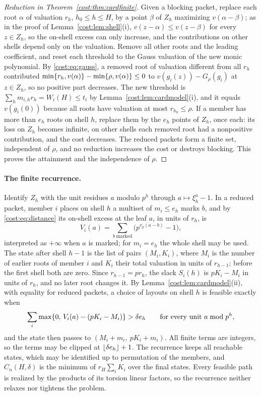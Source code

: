 \begin{proof}[Reduction in Theorem~\ref{cost:thm:cardfinite}]
Given a blocking packet, replace each root $\alpha$ of valuation $r_h$, $h_0\le h\le H$, by a
point $\beta$ of $Z_h$ maximizing $v(\alpha-\beta)$; as in the proof of
Lemma~\ref{cost:lem:shell}(i), $v(z-\alpha)\le v(z-\beta)$ for every $z\in Z_h$, so the
on-shell excess can only increase, and the contributions on other shells depend only on the
valuation. Remove all other roots and the leading coefficient, and reset each threshold to
the Gauss valuation of the new monic polynomial. By \eqref{cost:eq:gauss}, a removed root of
valuation different from all $r_h$ contributed $\min\{r_h,v(\alpha)\}-\min\{\rho,v(\alpha)\}\le0$
to $v(g_i(z))-G_\rho(g_i)$ at $z\in Z_h$, so no positive part decreases. The new threshold
is $\sum_hm_{i,h}r_h=W_i(H)\le t_i$ by Lemma~\ref{cost:lem:cardmodel}(i), and it equals
$v(g_i(0))$ because all roots have valuation at most $r_{h_0}\le\rho$. If a member has more
than $e_h$ roots on shell $h$, replace them by the $e_h$ points of $Z_h$, once each: its loss
on $Z_h$ becomes infinite, on other shells each removed root had a nonpositive contribution,
and the cost decreases. The reduced packets form a finite set, independent of $\rho$, and no
reduction increases the cost or destroys blocking. This proves the attainment and the
independence of $\rho$.
\end{proof}

\paragraph{The finite recurrence.}
Identify $Z_h$ with the unit residues $a$ modulo $p^h$ through $a\mapsto\xi_h^a-1$. In a
reduced packet, member $i$ places on shell $h$ a multiset of $m_i\le e_h$ marks $b$, and by
\eqref{cost:eq:distance} its on-shell excess at the leaf $a$, in units of $r_h$, is
\[
 V_i(a)=\sum_{b\ \mathrm{marked}}\bigl(p^{v_p(a-b)}-1\bigr),
\]
interpreted as $+\infty$ when $a$ is marked; for $m_i=e_h$ the whole shell may be used. The
state after shell $h-1$ is the list of pairs $(M_i,K_i)$, where $M_i$ is the number of
earlier roots of member $i$ and $K_i$ their total valuation in units of $r_{h-1}$; before
the first shell both are zero. Since $r_{h-1}=pr_h$, the slack $S_i(h)$ is $pK_i-M_i$ in
units of $r_h$, and no later root changes it. By Lemma~\ref{cost:lem:cardmodel}(ii), with
equality for reduced packets, a choice of layouts on shell $h$ is feasible exactly when
\begin{equation}\label{cost:eq:cardstep}
 \sum_i\max\{0,\,V_i(a)-(pK_i-M_i)\}>\delta e_h\qquad\text{for every unit }a\bmod p^h,
\end{equation}
and the state then passes to $(M_i+m_i,\ pK_i+m_i)$.
All finite terms are integers, so the terms may be clipped at $\lfloor\delta e_h\rfloor+1$. The
recurrence keeps all reachable states, which may be identified up to permutation of the
members, and $C_n(H,\delta)$ is the minimum of $r_H\sum_iK_i$ over the final states. Every
feasible path is realized by the products of its torsion linear factors, so the recurrence
neither relaxes nor tightens the problem.

